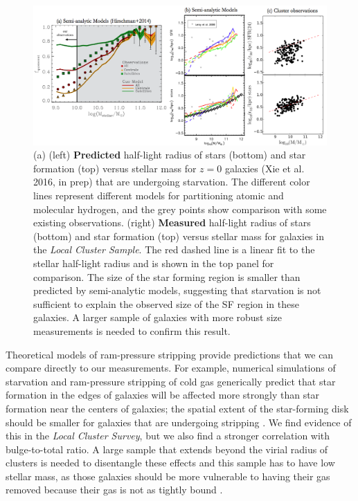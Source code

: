 \documentclass[11pt, preprint]{aastex}
\begin{document}
{%

\begin{figure}[h!]
\begin{center}
\includegraphics[width=\textwidth]{model-comparisonv2.png}
\end{center}
\caption{\small (a)  (left) {\bf Predicted} half-light radius
  of stars (bottom) and star formation (top) versus stellar mass for
  $z = 0 $ galaxies (Xie et al. 2016, in prep) that are undergoing starvation.
  The different color lines represent different models for partitioning
  atomic and molecular hydrogen, and the grey points show comparison
  with some existing observations.  
(right) {\bf Measured} half-light radius of stars (bottom) and star
formation (top) versus stellar mass for galaxies in the {\it Local Cluster Sample}.  The
red dashed line is a linear fit to the stellar half-light radius and
is shown in the top panel for comparison.  The size of the star
forming region is smaller than predicted by semi-analytic models,
suggesting that starvation is not sufficient to explain the observed
size of the SF region in these galaxies.  A larger sample of galaxies
with more robust size measurements is needed to confirm this result.}
\label{lizhi_comparison}
\end{figure}

Theoretical models of ram-pressure stripping provide predictions that
we can compare directly to our measurements.
For example, numerical simulations of starvation and ram-pressure stripping of cold gas 
generically predict that star formation in the edges
of galaxies will be affected more strongly than star formation near the
centers of galaxies; the spatial extent of the star-forming disk
should be smaller for galaxies that are undergoing stripping \citep[e.g.][]{kawata08, bekki14}.
We find evidence of this in the {\it Local Cluster Survey}, but we
also find a stronger correlation with bulge-to-total ratio.  A large sample that extends beyond the virial radius of clusters is needed to disentangle these effects and this sample has to have low stellar mass, as those galaxies should be more
vulnerable to having their gas removed 
because their gas is not as tightly
bound \citep[e.g.][]{kawata08, mccarthy07, bekki14}.

}
\end{document}
